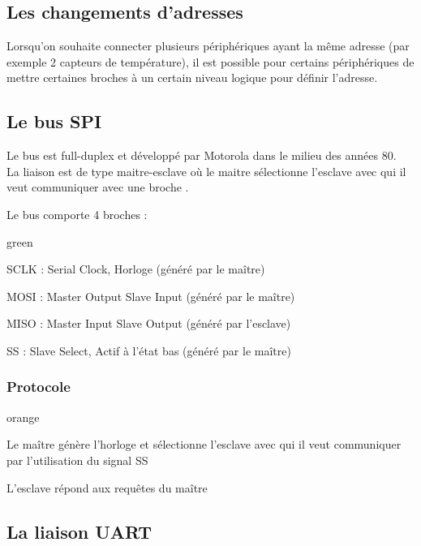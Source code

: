 \subsection{Les changements d'adresses}

Lorsqu'on souhaite connecter plusieurs périphériques ayant la même adresse (par exemple 2 capteurs de température), il est possible pour certains périphériques de mettre certaines broches à un certain niveau logique pour définir l'adresse.

\subsection{Le bus SPI} 

Le bus   est full-duplex et développé par Motorola dans le milieu des années 80.\\
La liaison est de type maitre-esclave où le maitre sélectionne l'esclave avec qui il veut communiquer avec une broche .

Le bus comporte 4 broches :

\begin{items}{green}{\Triangle}
    \item SCLK : Serial Clock, Horloge (généré par le maître)
    \item MOSI : Master Output Slave Input (généré par le maître)
    \item MISO : Master Input Slave Output (généré par l'esclave)
    \item SS : Slave Select, Actif à l'état bas (généré par le maître)
\end{items}


\subsubsection{Protocole}

\begin{items}{orange}{\Triangle}
    \item Le maître génère l'horloge et sélectionne l'esclave avec qui il veut communiquer par l'utilisation du signal SS
    \item L'esclave répond aux requêtes du maître
\end{items}



\subsection{La liaison UART} 

